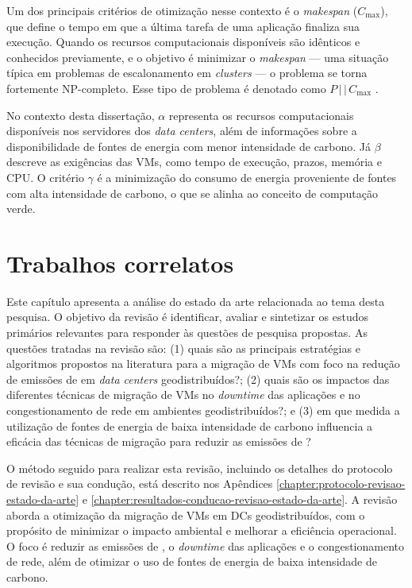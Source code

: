 \documentclass[
	12pt,				%
	oneside,			%
	a4paper,			%
	english,			%
	brazil				%
	]{abntex2ppgsi}
\begin{document}
Um dos principais critérios de otimização nesse contexto é o \textit{makespan} ($C_{\max}$), que define o tempo em que a última tarefa de uma aplicação finaliza sua execução. Quando os recursos computacionais disponíveis são idênticos e conhecidos previamente, e o objetivo é minimizar o \textit{makespan} --- uma situação típica em problemas de escalonamento em \textit{clusters} --- o problema se torna fortemente NP-completo. Esse tipo de problema é denotado como $P\,\vert\,\vert\,C_{\max}$ \cite{GRAHAM1979287}.

No contexto desta dissertação, $\alpha$ representa os recursos computacionais disponíveis nos servidores dos \textit{data centers}, além de informações sobre a disponibilidade de fontes de energia com menor intensidade de carbono. Já $\beta$ descreve as exigências das VMs, como tempo de execução, prazos, memória e CPU. O critério $\gamma$ é a minimização do consumo de energia proveniente de fontes com alta intensidade de carbono, o que se alinha ao conceito de computação verde.

\chapter{Trabalhos correlatos}\label{chapter:trabalhos-correlatos}
Este capítulo apresenta a análise do estado da arte relacionada ao tema desta pesquisa. O objetivo da revisão é identificar, avaliar e sintetizar os estudos primários relevantes para responder às questões de pesquisa propostas. As questões tratadas na revisão são: (1) quais são as principais estratégias e algoritmos propostos na literatura para a migração de VMs com foco na redução de emissões de  em \textit{data centers} geodistribuídos?; (2) quais são os impactos das diferentes técnicas de migração de VMs no \textit{downtime} das aplicações e no congestionamento de rede em ambientes geodistribuídos?; e (3) em que medida a utilização de fontes de energia de baixa intensidade de carbono influencia a eficácia das técnicas de migração para reduzir as emissões de ?

O método seguido para realizar esta revisão, incluindo os detalhes do protocolo de revisão e sua condução, está descrito nos Apêndices \ref{chapter:protocolo-revisao-estado-da-arte} e \ref{chapter:resultados-conducao-revisao-estado-da-arte}. A revisão aborda a otimização da migração de VMs em DCs geodistribuídos, com o propósito de minimizar o impacto ambiental e melhorar a eficiência operacional. O foco é reduzir as emissões de , o \textit{downtime} das aplicações e o congestionamento de rede, além de otimizar o uso de fontes de energia de baixa intensidade de carbono.
\end{document}
